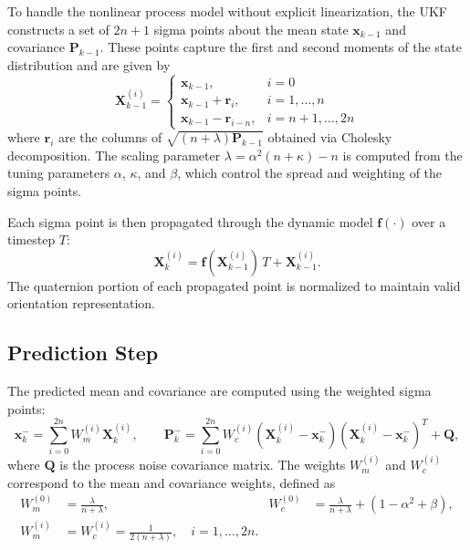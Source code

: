 To handle the nonlinear process model without explicit linearization, the UKF constructs a set of $2n+1$ sigma points about the mean state $\bm{x}_{k-1}$ and covariance $\bm{P}_{k-1}$. These points capture the first and second moments of the state distribution and are given by
\begin{equation}
    \bm{X}_{k-1}^{(i)} =
    \begin{cases}
        \bm{x}_{k-1}, & i = 0 \\[3pt]
        \bm{x}_{k-1} + \bm{r}_i, & i = 1,\dots,n\\[3pt]
        \bm{x}_{k-1} - \bm{r}_{i-n}, & i = n+1,\dots,2n
    \end{cases}
\end{equation}
where $\bm{r}_i$ are the columns of $\sqrt{(n+\lambda)\bm{P}_{k-1}}$ obtained via Cholesky decomposition. The scaling parameter $\lambda = \alpha^2(n+\kappa) - n$ is computed from the tuning parameters $\alpha$, $\kappa$, and $\beta$, which control the spread and weighting of the sigma points.

Each sigma point is then propagated through the dynamic model $\bm{f}(\cdot)$ over a timestep $T$:
\begin{equation}
    \bm{X}_k^{(i)} = \bm{f}(\bm{X}_{k-1}^{(i)})\,T + \bm{X}_{k-1}^{(i)}.
\end{equation}
The quaternion portion of each propagated point is normalized to maintain valid orientation representation.

\subsection*{Prediction Step}

The predicted mean and covariance are computed using the weighted sigma points:
\begin{equation}
    \bm{x}_k^- = \sum_{i=0}^{2n} W_m^{(i)} \bm{X}_k^{(i)}, \qquad
    \bm{P}_k^- = \sum_{i=0}^{2n} W_c^{(i)}(\bm{X}_k^{(i)} - \bm{x}_k^-)(\bm{X}_k^{(i)} - \bm{x}_k^-)^T + \bm{Q},
\end{equation}
where $\bm{Q}$ is the process noise covariance matrix. The weights $W_m^{(i)}$ and $W_c^{(i)}$ correspond to the mean and covariance weights, defined as
\begin{align}
    W_m^{(0)} &= \frac{\lambda}{n+\lambda}, &
    W_c^{(0)} &= \frac{\lambda}{n+\lambda} + (1-\alpha^2+\beta),\\
    W_m^{(i)} &= W_c^{(i)} = \frac{1}{2(n+\lambda)}, \quad i=1,\dots,2n.
\end{align}

